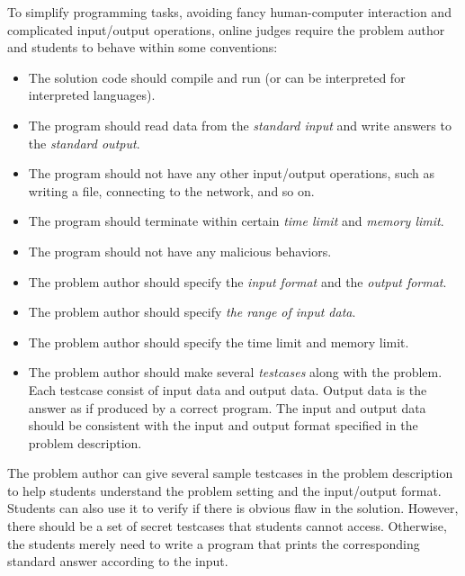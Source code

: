             To simplify programming tasks, avoiding fancy human-computer interaction
            and complicated input/output operations, online judges require the problem author and students
            to behave within some conventions:

            \begin{itemize}
                \item The solution code should compile and run (or can be interpreted for interpreted languages).
                \item The program should read data from the \emph{standard input}
                      and write answers to the \emph{standard output}.
                \item The program should not have any other input/output operations, such as writing a file,
                      connecting to the network, and so on.
                \item The program should terminate within certain \emph{time limit} and \emph{memory limit}.
                \item The program should not have any malicious behaviors.
                \item The problem author should specify the \emph{input format} and the \emph{output format}.
                \item The problem author should specify \emph{the range of input data}.
                \item The problem author should specify the time limit and memory limit.
                \item The problem author should make several \emph{testcases} along with the problem.
                      Each testcase consist of input data and output data.
                      Output data is the answer as if produced by a correct program.
                      The input and output data should be consistent with the input and output format
                      specified in the problem description.
            \end{itemize}

            The problem author can give several sample testcases in the problem description
            to help students understand the problem setting and the input/output format.
            Students can also use it to verify if there is obvious flaw in the solution.
            However, there should be a set of secret testcases that students cannot access.
            Otherwise, the students merely need to write a program that prints the corresponding
            standard answer according to the input.

